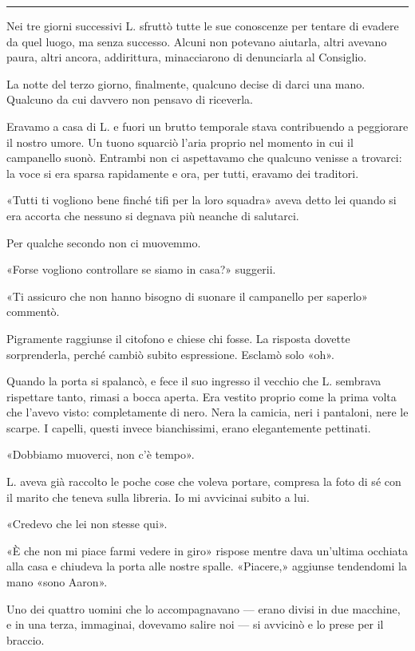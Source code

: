 \documentclass[a4paper,11pt,oneside,openright,final]{memoir}
\begin{document}
\plainbreak{1}

Nei tre giorni successivi L. sfruttò tutte le sue conoscenze per tentare di
evadere da quel luogo, ma senza successo. Alcuni non potevano aiutarla, altri
avevano paura, altri ancora, addirittura, minacciarono di denunciarla al
Consiglio.

La notte del terzo giorno, finalmente, qualcuno decise di darci una mano.
Qualcuno da cui davvero non pensavo di riceverla.

Eravamo a casa di L. e fuori un brutto temporale stava contribuendo a peggiorare
il nostro umore. Un tuono squarciò l'aria proprio nel momento in cui il
campanello suonò. Entrambi non ci aspettavamo che qualcuno venisse a trovarci:
la voce si era sparsa rapidamente e ora, per tutti, eravamo dei traditori.

«Tutti ti vogliono bene finché tifi per la loro squadra» aveva detto lei quando
si era accorta che nessuno si degnava più neanche di salutarci.

Per qualche secondo non ci muovemmo.

«Forse vogliono controllare se siamo in casa?» suggerii.

«Ti assicuro che non hanno bisogno di suonare il campanello per saperlo»
commentò.

Pigramente raggiunse il citofono e chiese chi fosse. La risposta dovette
sorprenderla, perché cambiò subito espressione. Esclamò solo «oh».

Quando la porta si spalancò, e fece il suo ingresso il vecchio che L. sembrava
rispettare tanto, rimasi a bocca aperta. Era vestito proprio come la prima volta
che l'avevo visto: completamente di nero. Nera la camicia, neri i pantaloni,
nere le scarpe. I capelli, questi invece bianchissimi, erano elegantemente
pettinati.

«Dobbiamo muoverci, non c'è tempo».

L. aveva già raccolto le poche cose che voleva portare, compresa la foto di sé
con il marito che teneva sulla libreria. Io mi avvicinai subito a lui.

«Credevo che lei non stesse qui».

«È che non mi piace farmi vedere in giro» rispose mentre dava un'ultima occhiata
alla casa e chiudeva la porta alle nostre spalle. «Piacere,» aggiunse tendendomi
la mano «sono Aaron».

Uno dei quattro uomini che lo accompagnavano --- erano divisi in due macchine,
e in una terza, immaginai, dovevamo salire noi --- si avvicinò e lo prese per
il braccio.
\end{document}
